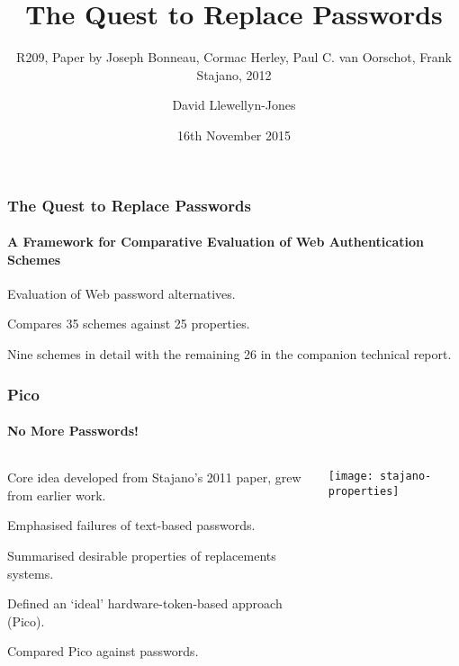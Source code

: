 \documentclass[handout, notes=hide]{beamer}
\newcommand{\prestext}[1]{\footnotetext{\cite{#1}}}
\begin{document}
\title{The Quest to Replace Passwords}
\subtitle{R209, Paper by Joseph Bonneau, Cormac Herley, Paul C. van Oorschot, Frank Stajano, 2012}
\author{David Llewellyn-Jones}
\date{16th November 2015}


\frame{\titlepage}


\begin{frame}
\frametitle{The Quest to Replace Passwords}
\framesubtitle{A Framework for Comparative Evaluation of Web Authentication Schemes}
\setlength{\parskip}{0.5em}

Evaluation of Web password alternatives.

Compares 35 schemes against 25 properties.

Nine schemes in detail with the remaining 26 in the companion technical report.

\end{frame}
\note{
}


\begin{frame}
\frametitle{Pico}
\framesubtitle{No More Passwords!}

\begin{columns}[T]
\begin{column}[T]{0.6\textwidth}
\setlength{\parskip}{0.5em}

Core idea developed from Stajano's 2011 paper, grew from earlier work\footnotemark.

Emphasised failures of text-based passwords.

Summarised desirable properties of replacements systems.

Defined an `ideal' hardware-token-based approach (Pico).

Compared Pico against passwords.

\end{column}
\begin{column}[T]{0.4\textwidth}
\hspace{-1.5em}
\texttt{[image: stajano-properties]}
\hspace{1.5em}
\end{column}
\end{columns}
\prestext{Stajano_2011, Stajano_2000}

\end{frame}
\end{document}
